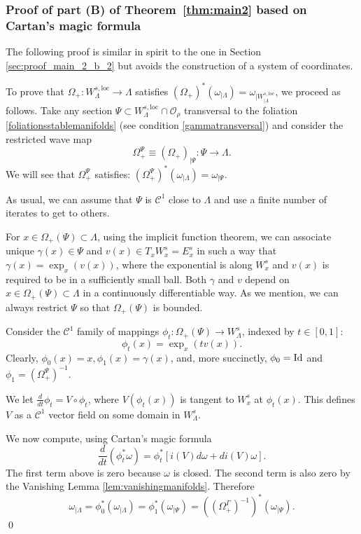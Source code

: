 \documentclass[11pt]{amsart}
\theoremstyle{definition}
\theoremstyle{remark}
\numberwithin{equation}{section}
\newcommand{\C}{\mathcal{C}}
\newcommand{\OO}{\mathcal{O}}
\def\Id{ {\rm Id}}
\begin{document}
\subsubsection{Proof of part (B) of Theorem~\ref{thm:main2} based on Cartan's magic formula}
\label{sec:magic}
The following proof is similar in spirit to the one in Section \ref{sec:proof_main_2_b_2}
 but avoids the construction of a system of coordinates.

 To prove that $\Omega_+:  W^{s,\mathrm{loc}}_\Lambda \to \Lambda$
  satisfies
  $(\Omega_+)^*(\omega_{\mid \Lambda})=\omega_{\mid W^{s,\mathrm{loc}}_{\mid \Lambda}}$, we
proceed as follows.
Take any section $\Psi \subset W^{s,\mathrm{loc}}_\Lambda \cap \OO_\rho$ transversal to the foliation \eqref{foliationsstablemanifolds} (see condition  \eqref{gammatransversal}) and consider the restricted  wave map
\[
\Omega_+^\Psi\equiv (\Omega_+)_{\mid \Psi}:\Psi\to \Lambda.
\]
We will see that $\Omega_+^\Psi$
satisfies:
$ (\Omega_+^\Psi)^* (\omega_{\mid \Lambda}) = \omega_{\mid \Psi}$.

As usual, we can assume that $\Psi$ is $\C^1$ close to $\Lambda$ and
use a finite number of iterates to get to others.

For   $x \in \Omega_+(\Psi)\subset \Lambda $, using the implicit function theorem,
 we can associate  unique $\gamma(x)  \in \Psi$ and $v(x) \in T_x W^s_x = E^s_x$
in such a way that
 $\gamma(x) = \exp_x(  v(x) )$, where the exponential is along $W^s_x$
 and $v(x)$ is required to be in a sufficiently small ball.
Both $\gamma$ and $v$   depend on $x\in\Omega_+(\Psi )\subset  \Lambda$
in a continuously differentiable way. As we mention,
we can always restrict $\Psi$ so that $\Omega_+(\Psi)$ is bounded.


Consider the $\C^1$ family  of mappings $\phi_t: \Omega_+(\Psi ) \to  W^s_\Lambda$,  indexed by  $t \in [0,1]$:
\[
\phi_t(x) = \exp_x (t v(x) ).
\]
Clearly,
$\phi_0(x) = x, \phi_1(x)  = \gamma(x)$,
and, more  succinctly,
$\phi_0 = \Id$ and $\phi_1 = (\Omega_+^\Psi )^{-1}$.

We let $\frac{d}{dt} \phi_t = V\circ \phi_t$, where   $V(\phi_t (x)) $ is tangent to $W^s_x$ at $\phi_t(x)$.
This defines $V$ as a $\C^1$ vector field on some domain in
$W^s_\Lambda$.


We now compute,  using Cartan's magic formula
\[
\frac{d}{dt} \left(\phi^*_t\omega \right)=  \phi_t^* \left[   i(V) d \omega +  d i(V) \omega\right].
\]
 The first term above is zero  because  $\omega$ is closed.
The second term is also zero  by the  Vanishing Lemma \ref{lem:vanishingmanifolds}.
Therefore
\[
\omega_{\mid\Lambda} = \phi_0^*( \omega_{\mid\Lambda}) =
\phi_1^*( \omega_{\mid \Psi})=  ((\Omega_+^\Gamma)^{-1})^* (\omega_{\mid\Psi}).
\]
\qed
\end{document}
